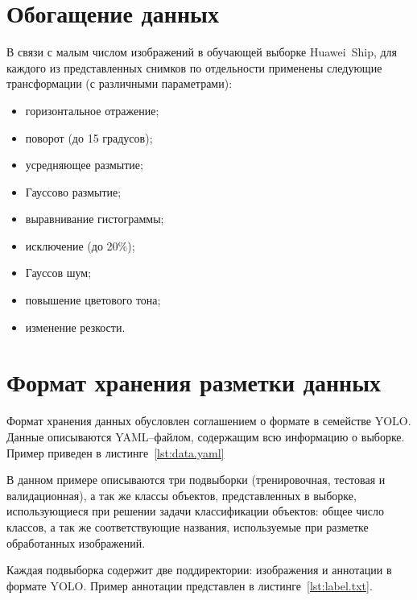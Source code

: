

\section{Обогащение данных}

В связи с малым числом изображений в обучающей выборке Huawei~Ship, для каждого из представленных снимков по отдельности применены следующие трансформации (с различными параметрами):
\begin{itemize}[label=---]
    \item горизонтальное отражение;
    \item поворот (до 15 градусов);
    \item усредняющее размытие;
    \item Гауссово размытие;
    \item выравнивание гистограммы;
    \item исключение (до 20\%);
    \item Гауссов шум;
    \item повышение цветового тона;
    \item изменение резкости.
\end{itemize}

\section{Формат хранения разметки данных}

Формат хранения данных обусловлен соглашением о формате в семействе YOLO. Данные описываются YAML--файлом, содержащим всю информацию о выборке. Пример приведен в листинге~\ref{lst:data.yaml} 


В данном примере описываются три подвыборки (тренировочная, тестовая и валидационная), а так же классы объектов, представленных в выборке, использующиеся при решении задачи классификации объектов: общее число классов, а так же соответствующие названия, используемые при разметке обработанных изображений.
 
Каждая подвыборка содержит две поддиректории: изображения и аннотации в формате YOLO. Пример аннотации представлен в листинге~\ref{lst:label.txt}.

